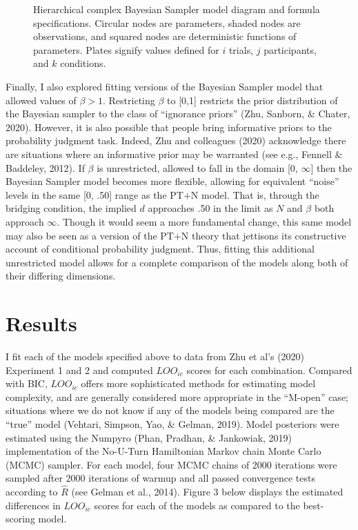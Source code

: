 \documentclass[
  english,
  man,floatsintext]{apa6}
\begin{document}
\begin{figure}
  \begin{minipage}{.5\textwidth}
    \flushright
    
  \end{minipage}%
  \begin{minipage}{.5\textwidth}
    \flushleft
    \small
    
  \end{minipage}
  \caption{Hierarchical complex Bayesian Sampler model diagram and formula specifications. Circular nodes are parameters, shaded nodes are observations, and squared nodes are deterministic functions of parameters. Plates signify values defined for $i$ trials, $j$ participants, and $k$ conditions.}
\end{figure}

Finally, I also explored fitting versions of the Bayesian Sampler model that allowed values of \(\beta > 1\). Restricting \(\beta\) to {[}0,1{]} restricts the prior distribution of the Bayesian sampler to the class of ``ignorance priors'' (Zhu, Sanborn, \& Chater, 2020). However, it is also possible that people bring informative priors to the probability judgment task. Indeed, Zhu and colleagues (2020) acknowledge there are situations where an informative prior may be warranted (see e.g., Fennell \& Baddeley, 2012). If \(\beta\) is unrestricted, allowed to fall in the domain {[}0, \(\infty\){]} then the Bayesian Sampler model becomes more flexible, allowing for equivalent ``noise'' levels in the same {[}0, .50{]} range as the PT+N model. That is, through the bridging condition, the implied \(d\) approaches .50 in the limit as \(N\) and \(\beta\) both approach \(\infty\). Though it would seem a more fundamental change, this same model may also be seen as a version of the PT+N theory that jettisons its constructive account of conditional probability judgment. Thus, fitting this additional unrestricted model allows for a complete comparison of the models along both of their differing dimensions.

\hypertarget{results}{%
\section{Results}\label{results}}

I fit each of the models specified above to data from Zhu et al's (2020) Experiment 1 and 2 and computed \(LOO_{ic}\) scores for each combination. Compared with BIC, \(LOO_{ic}\) offers more sophisticated methods for estimating model complexity, and are generally considered more appropriate in the ``M-open'' case; situations where we do not know if any of the models being compared are the ``true'' model (Vehtari, Simpson, Yao, \& Gelman, 2019). Model posteriors were estimated using the Numpyro (Phan, Pradhan, \& Jankowiak, 2019) implementation of the No-U-Turn Hamiltonian Markov chain Monte Carlo (MCMC) sampler. For each model, four MCMC chains of 2000 iterations were sampled after 2000 iterations of warmup and all passed convergence tests according to \(\hat{R}\) (see Gelman et al., 2014). Figure 3 below displays the estimated differences in \(LOO_{ic}\) scores for each of the models as compared to the best-scoring model.
\end{document}
